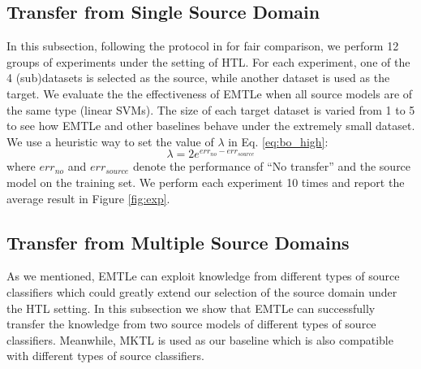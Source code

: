 \subsection{Transfer from Single Source Domain}
In this subsection, following the protocol in \cite{jie2011multiclass,tommasi2014learning} for fair comparison, we perform 12 groups of experiments under the setting of HTL. 
For each experiment, one of the 4 (sub)datasets is selected as the source, while another dataset is used as the target. We evaluate the the effectiveness of EMTLe when all source models are of the same type (linear SVMs).
The size of each target dataset is varied from 1 to 5 to see how EMTLe and other baselines behave under the extremely small dataset. We use a heuristic way to set the value of $\lambda$ in Eq. \eqref{eq:bo_high}:
\begin{equation}
\lambda = 2e^{err_{no}-err_{source}}
\end{equation}
where $err_{no}$ and $err_{source}$ denote the performance of ``No transfer'' and the source model on the training set.
We perform each experiment 10 times and report the average result in Figure \ref{fig:exp}. 


\subsection{Transfer from Multiple Source Domains}
As we mentioned, EMTLe can exploit knowledge from different types of source classifiers which could greatly extend our selection of the source domain under the HTL setting. In this subsection we show that EMTLe can successfully transfer the knowledge from two source models of different types of source classifiers. Meanwhile, MKTL is used as our baseline which is also compatible with different types of source classifiers. 

